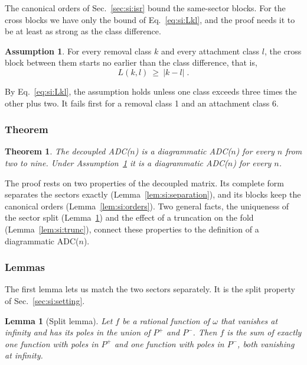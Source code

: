\documentclass[aip,jcp,reprint,noshowkeys,superscriptaddress]{revtex4-2}
\theoremstyle{plain}
\newtheorem{theorem}{Theorem}
\newtheorem{lemma}{Lemma}
\theoremstyle{definition}
\newtheorem{assumption}{Assumption}
\theoremstyle{remark}
\begin{document}
The canonical orders of Sec.~\ref{sec:si:isr} bound the same-sector blocks. For
the cross blocks we have only the bound of Eq.~\eqref{eq:si:Lkl}, and the proof
needs it to be at least as strong as the class difference.

\begin{assumption}
\label{ass:si:A3}
For every removal class $k$ and every attachment class $l$, the cross
block between them starts no earlier than the class difference, that is,
\begin{equation}
L(k,l)\ \ge\ |k-l| \;.
\label{eq:si:A3}
\end{equation}
\end{assumption}

By Eq.~\eqref{eq:si:Lkl}, the assumption holds unless one class exceeds three
times the other plus two. It fails first for a removal class 1 and an
attachment class 6.

\subsubsection{Theorem}

\begin{theorem}
\label{thm:si:decoupling}
The decoupled ADC($n$) is a diagrammatic ADC($n$) for every $n$ from two to
nine. Under Assumption~\ref{ass:si:A3} it is a diagrammatic ADC($n$) for every
$n$.
\end{theorem}

The proof rests on two properties of the decoupled matrix. Its complete form
separates the sectors exactly (Lemma~\ref{lem:si:separation}), and its blocks
keep the canonical orders (Lemma~\ref{lem:si:orders}). Two general facts, the
uniqueness of the sector split (Lemma~\ref{lem:si:split}) and the effect of a
truncation on the fold (Lemma~\ref{lem:si:trunc}), connect these properties to
the definition of a diagrammatic ADC($n$).

\subsubsection{Lemmas}

The first lemma lets us match the two sectors separately. It is the split
property of Sec.~\ref{sec:si:setting}.

\begin{lemma}[Split lemma]
\label{lem:si:split}
Let $f$ be a rational function of $\omega$ that vanishes at infinity and has
its poles in the union of $P^+$ and $P^-$. Then $f$ is the sum of exactly one
function with poles in $P^+$ and one function with poles in $P^-$, both
vanishing at infinity.
\end{lemma}
\end{document}
